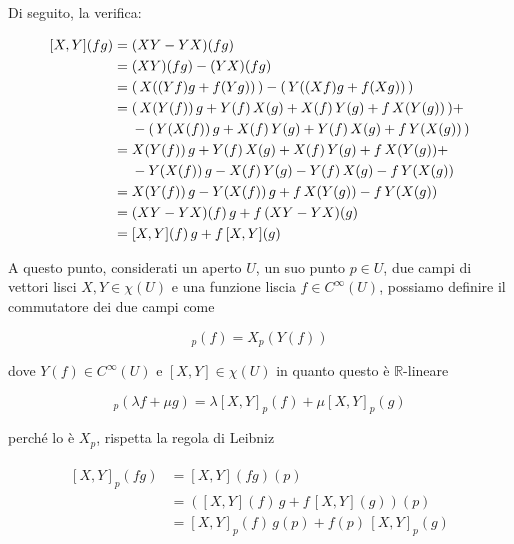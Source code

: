 Di seguito, la verifica:

\begin{align}
	\begin{split}
		[X,Y](fg) &= (XY-YX)(fg)\\
		&= (XY)(fg) - (YX)(fg)\\
		&= ( \, X((Yf) g + f (Y g)) \, ) - ( \, Y((Xf) g + f (X g)) \, )\\
		&= ( \, X(Y(f)) \, g + Y(f) \, X(g) + X(f) \, Y(g) + f \, X(Y(g)) \, ) + \\
		& \hspace{13px} - ( \, Y(X(f)) \, g + X(f) \, Y(g) + Y(f) \, X(g) + f \, Y(X(g)) \, )\\
		&= X(Y(f)) \, g + Y(f) \, X(g) + X(f) \, Y(g) + f \, X(Y(g)) + \\
		& \hspace{13px} - Y(X(f)) \, g - X(f) \, Y(g) - Y(f) \, X(g) - f \, Y(X(g))\\
		&= X(Y(f)) \, g - Y(X(f)) \, g + f \, X(Y(g)) - f \, Y(X(g))\\
		&= (XY-YX)(f) \, g + f \, (XY-YX)(g)\\
		&= [X,Y](f) \, g + f \, [X,Y](g)
	\end{split}
\end{align}

A questo punto, considerati un aperto $ U $, un suo punto $ p \in U $, due campi di vettori lisci $ X,Y \in \chi(U) $ e una funzione liscia $ f \in C^{\infty}(U) $, possiamo definire il commutatore dei due campi come

\begin{equation}
	[X,Y]_{p}(f) = X_{p} (Y(f))
\end{equation}

dove $ Y(f) \in C^{\infty}(U) $ e $ [X,Y] \in \chi(U) $ in quanto questo è $ \mathbb{R} $-lineare

\begin{equation}
	[X,Y]_{p}(\lambda f + \mu g) = \lambda [X,Y]_{p}(f) + \mu [X,Y]_{p}(g)
\end{equation}

perché lo è $ X_{p} $, rispetta la regola di Leibniz

\begin{align}
	\begin{split}
		[X,Y]_{p}(fg) &= [X,Y](fg)(p)\\
		&= ([X,Y](f) \, g + f \, [X,Y](g))(p)\\
		&= [X,Y]_{p}(f) \, g(p) + f(p) \, [X,Y]_{p}(g)
	\end{split}
\end{align}

